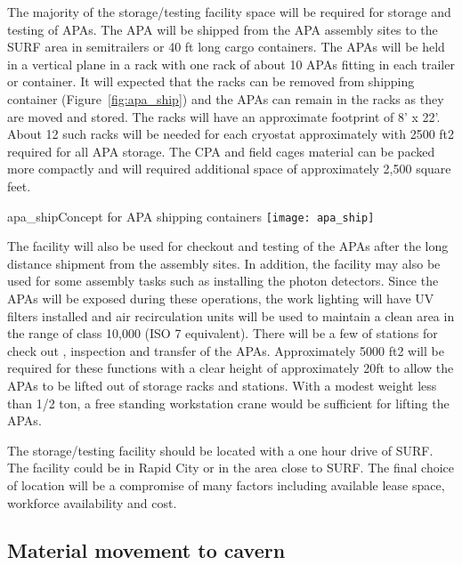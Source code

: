 The majority of the storage/testing facility space will be required for storage and testing of APAs. The APA will be shipped from the APA assembly sites to the SURF area in semitrailers or 40 ft long cargo containers. The APAs 
will be held in a vertical plane in a rack with one rack of about 10 APAs fitting in each trailer or container. It will expected that the racks can be removed from shipping container (Figure~\ref{fig:apa_ship}) and the APAs can remain in the racks as they are 
moved and stored.  The racks will have an approximate footprint of 8' x 22'. About 12 such racks will be needed for each cryostat approximately with 2500 ft2 required for all APA storage. The CPA and field cages material can be packed more compactly and will required additional space of approximately 2,500 square feet.

\begin{cdrfigure}{apa_ship}{Concept for APA shipping containers}
\texttt{[image: apa\_ship]}
\end{cdrfigure}


The facility will also be used for checkout and testing of the APAs after the long distance shipment from the assembly sites. In addition, the facility may also be used for some assembly tasks such as installing the photon 
detectors. Since the APAs will be exposed during these operations, the work lighting will have UV filters installed and air recirculation units will be used to maintain a clean area in the range of class 10,000 (ISO 7 equivalent). 
There will be a few of stations for check out , inspection and transfer of the APAs. Approximately 5000 ft2 will be required for these functions with a clear height of approximately 20ft to allow the APAs to be lifted out of storage 
racks and stations. With a modest weight less than 1/2 ton, a free standing workstation crane would be sufficient for lifting the APAs.

The storage/testing facility should be located with a one hour drive of SURF. The facility could be in Rapid City or in the area close to SURF. The final choice of location will be a compromise of many factors including available 
lease space, workforce availability and cost.

\subsection{Material movement to cavern}
\label{fd:install:fsinstall:mat:movement}

